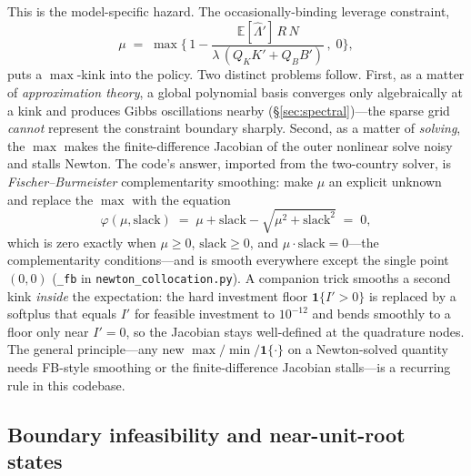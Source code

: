 \documentclass[11pt]{article}
\newcommand{\E}{\mathbb{E}}
\newcommand{\code}[1]{\texttt{#1}}
\begin{document}
This is the model-specific hazard. The occasionally-binding leverage
constraint,
\[
\mu \;=\; \max\!\Big\{\,1-\frac{\E[\hat\Lambda']\,R\,N}{\lambda\,(Q_KK'+Q_BB')}\,,\;0\Big\},
\]
puts a $\max$-kink into the policy. Two distinct problems follow.
First, as a matter of \emph{approximation theory}, a global polynomial
basis converges only algebraically at a kink and produces Gibbs oscillations
nearby (\S\ref{sec:spectral})---the sparse grid \emph{cannot} represent the
constraint boundary sharply. Second, as a matter of \emph{solving}, the
$\max$ makes the finite-difference Jacobian of the outer nonlinear solve
noisy and stalls Newton. The code's answer, imported from the two-country
solver, is \emph{Fischer--Burmeister} complementarity smoothing: make $\mu$
an explicit unknown and replace the $\max$ with the equation
\begin{equation}
\varphi(\mu,\text{slack}) \;=\; \mu+\text{slack}-\sqrt{\mu^2+\text{slack}^2}\;=\;0,
\label{eq:fb}
\end{equation}
which is zero exactly when $\mu\ge0$, $\text{slack}\ge0$, and
$\mu\cdot\text{slack}=0$---the complementarity conditions---and is smooth
everywhere except the single point $(0,0)$ (\code{\_fb} in
\code{newton\_collocation.py}). A companion trick smooths a second kink
\emph{inside} the expectation: the hard investment floor
$\mathbf{1}\{I'>0\}$ is replaced by a softplus that equals $I'$ for feasible
investment to $10^{-12}$ and bends smoothly to a floor only near $I'=0$, so
the Jacobian stays well-defined at the quadrature nodes. The general
principle---any new $\max/\min/\mathbf{1}\{\cdot\}$ on a Newton-solved
quantity needs FB-style smoothing or the finite-difference Jacobian
stalls---is a recurring rule in this codebase.

\subsection{Boundary infeasibility and near-unit-root states}
\end{document}
